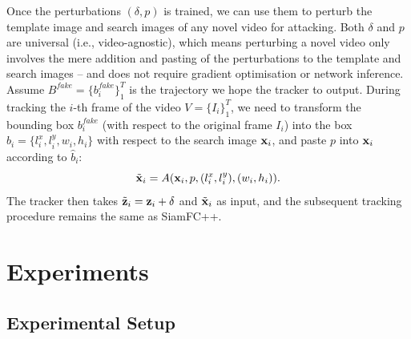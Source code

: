 \documentclass[journal]{IEEEtran}
\begin{document}
Once the perturbations $(\delta, p)$ is trained, we can use them to perturb the template image and search images of any novel video for attacking. Both $\delta$ and $p$ are universal (i.e., video-agnostic), which means perturbing a novel video only involves the mere addition and pasting of the perturbations to the template and search images -- and does not require gradient optimisation or network inference.
Assume $B^{fake}=\{b^{fake}_i\}_1^{T}$ is the trajectory we hope the tracker to output.
During tracking the $i$-th frame of the video $V=\{I_i\}_1^T$, we need to transform the bounding box $b^{fake}_i$ (with respect to the original frame $I_i$) into the box $\hat b_i=\{l^x_i, l^y_i, w_i, h_i\}$ with respect to the search image $\textbf x_i$, and paste $p$ into $\textbf x_i$ according to $\hat b_i$:
\begin{equation}
\tilde{\textbf x}_i = A(\textbf x_i, p, (l^x_i, l^y_i), (w_i, h_i)).
\end{equation}
The tracker then takes $\tilde{\textbf z}_i=\textbf z_i+\delta$ and $\tilde{ \textbf x}_i$ as input, and the subsequent tracking procedure remains the same as SiamFC++.

\section{Experiments}

\subsection{Experimental Setup}
\end{document}
